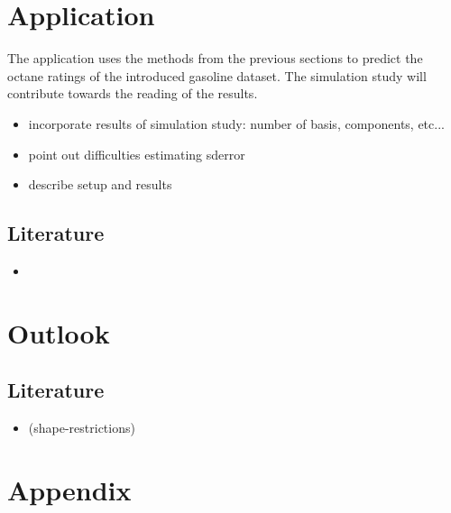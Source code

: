 \documentclass[11pt,twoside,a4paper]{article}
\begin{document}
	\section{Application}\label{Application}
		The application uses the methods from the previous sections to predict the octane ratings of the introduced gasoline dataset. The simulation study will contribute towards the reading of the results. 
		\begin{itemize}
			\item {\color{green} incorporate results of simulation study: 					number of basis, components, etc...}
			\item point out difficulties estimating sderror
			\item describe setup and results
		\end{itemize}
	
	\subsection{Literature}
	\begin{itemize}
		\item \cite{carey_life_2002}
	\end{itemize}

	\section{Outlook}\label{Outlook}
	
	\subsection{Literature}
	\begin{itemize}
		\item \cite{James.2009} (shape-restrictions)
	\end{itemize}
	
	\newpage
	\section{Appendix}
	
\end{document}
